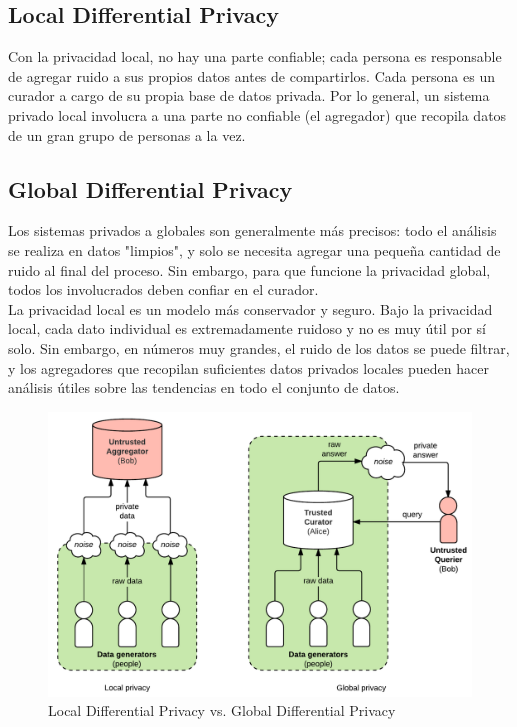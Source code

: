 \documentclass[
11pt, %
oneside, %
spanish, %
singlespacing, %
parskip, %
headsepline, %
chapterinoneline, %
]{MastersDoctoralThesis} %
\begin{document}
\subsection{Local Differential Privacy}
Con la privacidad local, no hay una parte confiable; cada persona es responsable de agregar ruido a sus propios datos antes de compartirlos. Cada persona es un curador a cargo de su propia base de datos privada. Por lo general, un sistema privado local involucra a una parte no confiable (el agregador) que recopila datos de un gran grupo de personas a la vez.

\subsection{Global Differential Privacy}
Los sistemas privados a globales son generalmente más precisos: todo el análisis se realiza en datos "limpios", y solo se necesita agregar una pequeña cantidad de ruido al final del proceso. Sin embargo, para que funcione la privacidad global, todos los involucrados deben confiar en el curador. \\
La privacidad local es un modelo más conservador y seguro. Bajo la privacidad local, cada dato individual es extremadamente ruidoso y no es muy útil por sí solo. Sin embargo, en números muy grandes, el ruido de los datos se puede filtrar, y los agregadores que recopilan suficientes datos privados locales pueden hacer análisis útiles sobre las tendencias en todo el conjunto de datos.

\begin{figure}[H]
  	\centering
	\includegraphics[scale=0.7]{imgs/diff-privacy.png}
	\caption{Local Differential Privacy vs. Global Differential Privacy}
\end{figure}
\end{document}
